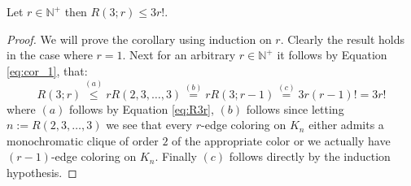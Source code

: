 \newpage
\begin{corollary}\label{cor:R3r}
	Let $r \in \mathbb{N}^{+}$ then $R(3; r) \leq 3r!$.
\end{corollary}
\begin{proof}
	We will prove the corollary using induction on $r$. Clearly the result holds in the case where $r = 1$. Next for an arbitrary $r \in \mathbb{N}^{+}$ it follows by Equation \eqref{eq:cor_1}, that:
	\begin{equation}\label{eq:R3r}
		R(3; r) \stackrel{(a)}{\leq} r R(2, 3, \ldots, 3) \stackrel{(b)}{=} r R(3; r - 1) \stackrel{(c)}{=} 3r (r - 1)! = 3r!
	\end{equation}
	where $(a)$ follows by Equation \eqref{eq:R3r}, $(b)$ follows since letting $n := R(2, 3, \ldots, 3)$ we see that every $r$-edge coloring on $K_n$ either admits a monochromatic clique of order $2$ of the appropriate color or we actually have $(r - 1)$-edge coloring on $K_n$. Finally $(c)$ follows directly by the induction hypothesis.
\end{proof}


